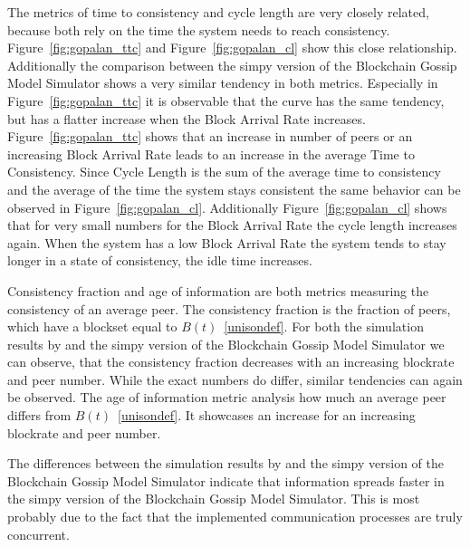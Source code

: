 The metrics of time to consistency and cycle length are very closely related, because both rely on the time the system needs to reach consistency.
Figure~\ref{fig:gopalan_ttc} and Figure~\ref{fig:gopalan_cl} show this close relationship. Additionally the comparison between the simpy version of the Blockchain Gossip Model Simulator shows a very similar tendency in both metrics. Especially in Figure~\ref{fig:gopalan_ttc} it is observable that the curve has the same tendency, but has a flatter increase when the Block Arrival Rate increases. Figure~\ref{fig:gopalan_ttc} shows that an increase in number of peers or an increasing Block Arrival Rate leads to an increase in the average Time to Consistency. Since Cycle Length is the sum of the average time to consistency and the average of the time the system stays consistent the same behavior can be observed in Figure~\ref{fig:gopalan_cl}. Additionally Figure~\ref{fig:gopalan_cl} shows that for very small numbers for the Block Arrival Rate the cycle length increases again. When the system has a low Block Arrival Rate the system tends to stay longer in a state of consistency, the idle time increases.

Consistency fraction and age of information are both metrics measuring the consistency of an average peer. The consistency fraction is the fraction of peers, which have a blockset equal to $B(t)$~\ref{unisondef}. For both the simulation results by \gopalan and the simpy version of the Blockchain Gossip Model Simulator we can observe, that the consistency fraction decreases with an increasing blockrate and peer number. While the exact numbers do differ, similar tendencies can again be observed.
The age of information metric analysis how much an average peer differs from $B(t)$~\ref{unisondef}. It showcases an increase for an increasing blockrate and peer number.

The differences between the simulation results by \gopalan and the simpy version of the Blockchain Gossip Model Simulator indicate that information spreads faster in the simpy version of the Blockchain Gossip Model Simulator. This is most probably due to the fact that the implemented communication processes are truly concurrent.	



